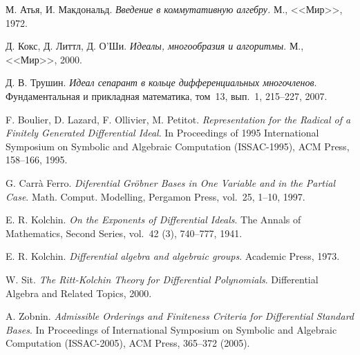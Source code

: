 \documentclass[11pt]{article}
\theoremstyle{plain}
\theoremstyle{definition}
\theoremstyle{remark}
\begin{document}
\begin{thebibliography}{99}

М. Атья, И. Макдональд.
\emph{Введение в коммутативную алгебру.} М., <<Мир>>, 1972.

Д. Кокс, Д. Литтл, Д. О'Ши.
\emph{Идеалы, многообразия и алгоритмы}.
М., <<Мир>>, 2000.

Д. В. Трушин.
\emph{Идеал сепарант в кольце дифференциальных многочленов}.
Фундаментальная и прикладная математика, том~13, вып.~1, 215--227, 2007.

F. Boulier, D. Lazard, F. Ollivier, M. Petitot.
\emph{Representation for the Radical of a Finitely Generated Differential Ideal}.
In Proceedings of 1995 International Symposium on Symbolic and Algebraic Computation (ISSAC-1995), ACM Press, 158--166, 1995.
 
G. Carr\`a Ferro.
\emph{Diferential Gr\"{o}bner Bases in One Variable and in the Partial Case}.
Math. Comput. Modelling, Pergamon Press, vol.~25, 1--10, 1997.

E. R. Kolchin.
\emph{On the Exponents of Differential Ideals}.
The Annals of Mathematics, Second Series, vol.~42 (3), 740--777, 1941.

E. R. Kolchin.
\emph{Differential algebra and algebraic groups}.
Academic Press, 1973.

W. Sit.
\emph{The Ritt-Kolchin Theory for Differential Polynomials}.
Differential Algebra and Related Topics, 2000.

A. Zobnin. 
\emph{Admissible Orderings and Finiteness Criteria for Differential Standard Bases}. 
In Proceedings of International Symposium on Symbolic and Algebraic Computation (ISSAC-2005), ACM Press,
365--372 (2005).
\end{thebibliography}
\end{document}

